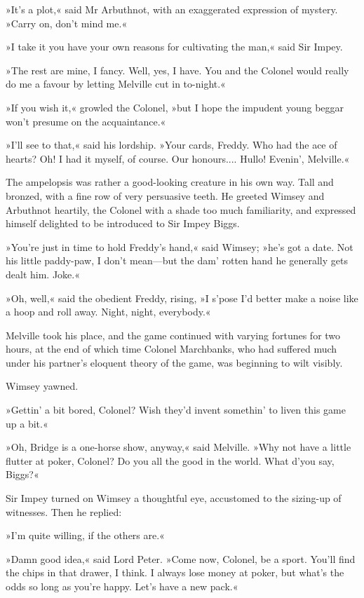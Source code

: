 »It's a plot,« said Mr Arbuthnot, with an exaggerated expression of mystery. »Carry on, don't mind me.«

»I take it you have your own reasons for cultivating the man,« said Sir Impey.

»The rest are mine, I fancy. Well, yes, I have. You and the Colonel would really do me a favour by letting Melville cut in to-night.«

»If you wish it,« growled the Colonel, »but I hope the impudent young beggar won't presume on the acquaintance.«

»I'll see to that,« said his lordship. »Your cards, Freddy. Who had the ace of hearts? Oh! I had it myself, of course. Our honours.... Hullo! Evenin', Melville.«

The ampelopsis was rather a good-looking creature in his own way. Tall and bronzed, with a fine row of very persuasive teeth. He greeted Wimsey and Arbuthnot heartily, the Colonel with a shade too much familiarity, and expressed himself delighted to be introduced to Sir Impey Biggs.

»You're just in time to hold Freddy's hand,« said Wimsey; »he's got a date. Not his little paddy-paw, I don't mean—but the dam' rotten hand he generally gets dealt him. Joke.«

»Oh, well,« said the obedient Freddy, rising, »I s'pose I'd better make a noise like a hoop and roll away. Night, night, everybody.«

Melville took his place, and the game continued with varying fortunes for two hours, at the end of which time Colonel Marchbanks, who had suffered much under his partner's eloquent theory of the game, was beginning to wilt visibly.

Wimsey yawned.

»Gettin' a bit bored, Colonel? Wish they'd invent somethin' to liven this game up a bit.«

»Oh, Bridge is a one-horse show, anyway,« said Melville. »Why not have a little flutter at poker, Colonel? Do you all the good in the world. What d'you say, Biggs?«

Sir Impey turned on Wimsey a thoughtful eye, accustomed to the sizing-up of witnesses. Then he replied:

»I'm quite willing, if the others are.«

»Damn good idea,« said Lord Peter. »Come now, Colonel, be a sport. You'll find the chips in that drawer, I think. I always lose money at poker, but what's the odds so long as you're happy. Let's have a new pack.«

